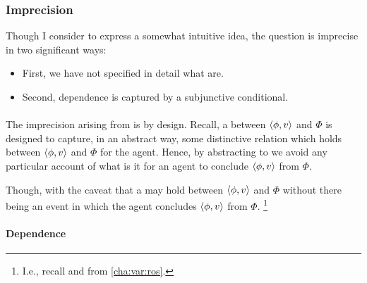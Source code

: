 \subsubsection{Imprecision}

\begin{note}
  Though I consider \qWhyV{} to express a somewhat intuitive idea, the question is imprecise in two significant ways:
  \begin{itemize}[noitemsep]
  \item
    First, we have not specified in detail what \ros{} are.
  \item
    Second, dependence is captured by a subjunctive conditional.
  \end{itemize}
\end{note}

\paragraph{}

\begin{note}
  The imprecision arising from  is by design.
  Recall, a \ros{} between \(\langle \phi, v \rangle\) and \(\Phi\) is designed to capture, in an abstract way, some distinctive relation which holds between \(\langle \phi, v \rangle\) and \(\Phi\) for the agent.
  Hence, by abstracting to  we avoid any particular account of what is it for an agent to conclude \(\langle \phi, v \rangle\) from \(\Phi\).

  Though, with the caveat that a \ros{} may hold between \(\langle \phi, v \rangle\) and \(\Phi\) without there being an event in which the agent concludes \(\langle \phi, v \rangle\) from \(\Phi\).%
  \footnote{
    I.e., recall \supportI{} and \supportII{} from \autoref{cha:var:ros}.
  }
\end{note}

\paragraph{Dependence}

\nocite{Lewis:1973aa}

